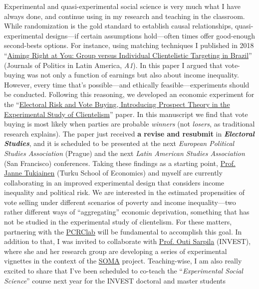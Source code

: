 \documentclass[10pt,stdletter,dateno,sigleft]{newlfm} %
\begin{document}
\begin{newlfm}
Experimental and quasi-experimental social science is very much what I have always done, and continue using in my research and teaching in the classroom. While randomization is the gold standard to establish causal relationships, quasi-experimental designs---if certain assumptions hold---often times offer good-enough second-bests options. For instance, using matching techniques I published in 2018 ``\href{https://journals.sub.uni-hamburg.de/giga/jpla/article/view/1121/1128}{Aiming Right at You: Group versus Individual Clientelistic Targeting in Brazil}'' (Journals of Politics in Latin America, \emph{A1}). In this paper I argued that vote-buying was not only a function of earnings but also about income inequality. However, every time that's possible---and ethically feasible---experiments should be conducted. Following this reasoning, we developed an economic experiment for the ``\href{https://github.com/hbahamonde/Economic_Experiment_Vote_Selling/raw/master/Vote_Selling_Bahamonde_Canales_Paper.pdf}{Electoral Risk and Vote Buying, Introducing Prospect Theory in the Experimental Study of Clientelism}'' paper. In this manuscript we find that vote buying is most likely when parties are probable \emph{winners} (not \emph{losers}, as traditional research explains). The paper just received  {\bf a revise and resubmit} in {\bf \emph{Electoral Studies}}, and it is scheduled to be presented at the next \emph{European Political Studies Association} (Prague) and the next \emph{Latin American Studies Association} (San Francisco) conferences. Taking these findings as a starting point, \href{https://www.utu.fi/en/people/janne-tukiainen}{Prof. Janne Tukiainen} (Turku School of Economics) and myself are currently collaborating in an improved experimental design that considers income inequality and political risk. We are interested in the estimated propensities of vote selling under different scenarios of poverty and income inequality---two rather different ways of ``aggregating'' economic deprivation, something that has not be studied in the experimental study of clientelism. For these matters, partnering with the \href{https://pcrclab.utu.fi/?page_id=894&lang=en}{PCRClab} will be fundamental to accomplish this goal. In addition to that, I was invited to collaborate with \href{https://www.utu.fi/en/people/outi-sarpila}{Prof. Outi Sarpila} (INVEST), where she and her research group are developing a series of experimental vignettes in the context of the \href{https://soma.utu.fi}{SOMA} project. Teaching-wise, I am also really excited to share that I've been scheduled to co-teach the ``\emph{Experimental Social Science}'' course next year for the INVEST doctoral and master students


\end{newlfm}
\end{document}
